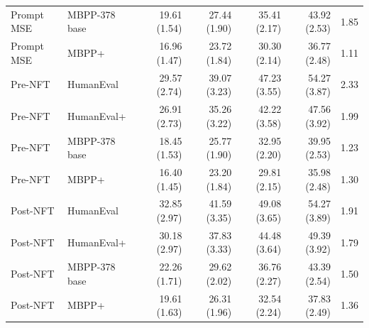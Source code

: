 \documentclass{article}
\begin{document}
\begin{table}[htbp]
\begin{tabular}{@{}llrrrrr@{}}
Prompt MSE & MBPP-378 base & 19.61 {\scriptsize (1.54)} & 27.44 {\scriptsize (1.90)} & 35.41 {\scriptsize (2.17)} & 43.92 {\scriptsize (2.53)} & 1.85\\
Prompt MSE & MBPP+ & 16.96 {\scriptsize (1.47)} & 23.72 {\scriptsize (1.84)} & 30.30 {\scriptsize (2.14)} & 36.77 {\scriptsize (2.48)} & 1.11\\
\midrule
Pre-NFT & HumanEval & 29.57 {\scriptsize (2.74)} & 39.07 {\scriptsize (3.23)} & 47.23 {\scriptsize (3.55)} & 54.27 {\scriptsize (3.87)} & 2.33\\
Pre-NFT & HumanEval+ & 26.91 {\scriptsize (2.73)} & 35.26 {\scriptsize (3.22)} & 42.22 {\scriptsize (3.58)} & 47.56 {\scriptsize (3.92)} & 1.99\\
Pre-NFT & MBPP-378 base & 18.45 {\scriptsize (1.53)} & 25.77 {\scriptsize (1.90)} & 32.95 {\scriptsize (2.20)} & 39.95 {\scriptsize (2.53)} & 1.23\\
Pre-NFT & MBPP+ & 16.40 {\scriptsize (1.45)} & 23.20 {\scriptsize (1.84)} & 29.81 {\scriptsize (2.15)} & 35.98 {\scriptsize (2.48)} & 1.30\\
\midrule
Post-NFT & HumanEval & 32.85 {\scriptsize (2.97)} & 41.59 {\scriptsize (3.35)} & 49.08 {\scriptsize (3.65)} & 54.27 {\scriptsize (3.89)} & 1.91\\
Post-NFT & HumanEval+ & 30.18 {\scriptsize (2.97)} & 37.83 {\scriptsize (3.33)} & 44.48 {\scriptsize (3.64)} & 49.39 {\scriptsize (3.92)} & 1.79\\
Post-NFT & MBPP-378 base & 22.26 {\scriptsize (1.71)} & 29.62 {\scriptsize (2.02)} & 36.76 {\scriptsize (2.27)} & 43.39 {\scriptsize (2.54)} & 1.50\\
Post-NFT & MBPP+ & 19.61 {\scriptsize (1.63)} & 26.31 {\scriptsize (1.96)} & 32.54 {\scriptsize (2.24)} & 37.83 {\scriptsize (2.49)} & 1.36\\
\bottomrule
\end{tabular}
\end{table}
\end{document}
